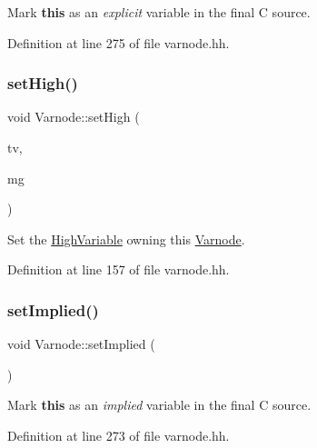 Mark {\bfseries{this}} as an {\itshape explicit} variable in the final C source. 



Definition at line 275 of file varnode.\+hh.

\mbox{\label{class_varnode_a22f87b67491d66a91480feb87ad69102}} 
\subsubsection{\texorpdfstring{setHigh()}{setHigh()}}
{\footnotesize\ttfamily void Varnode\+::set\+High (\begin{DoxyParamCaption}\item[{\mbox{\hyperlink{class_high_variable}{High\+Variable}} $\ast$}]{tv,  }\item[{int2}]{mg }\end{DoxyParamCaption})\hspace{0.3cm}{\ttfamily [inline]}}



Set the \mbox{\hyperlink{class_high_variable}{High\+Variable}} owning this \mbox{\hyperlink{class_varnode}{Varnode}}. 



Definition at line 157 of file varnode.\+hh.

\mbox{\label{class_varnode_a9a59015e5303190f843f3f30bc63984c}} 
\subsubsection{\texorpdfstring{setImplied()}{setImplied()}}
{\footnotesize\ttfamily void Varnode\+::set\+Implied (\begin{DoxyParamCaption}\item[{void}]{ }\end{DoxyParamCaption})\hspace{0.3cm}{\ttfamily [inline]}}



Mark {\bfseries{this}} as an {\itshape implied} variable in the final C source. 



Definition at line 273 of file varnode.\+hh.

\mbox{\label{class_varnode_a1ea767056d60173b7a6e57529ea32521}} 
